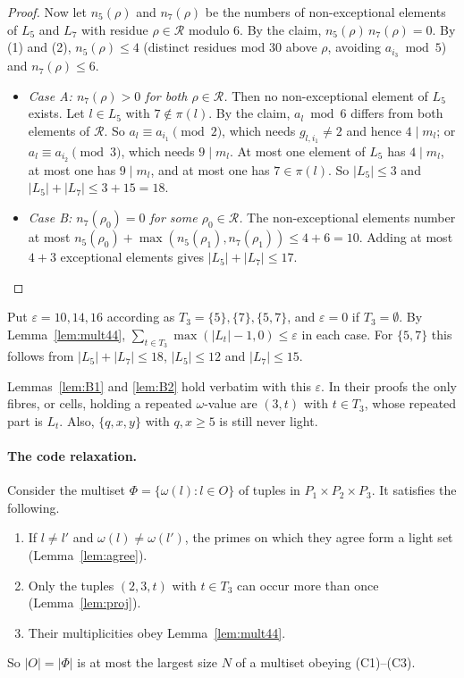 \documentclass[11pt]{article}
\theoremstyle{definition}
\theoremstyle{remark}
\begin{document}
\begin{proof}
Now let $n_5(\rho)$ and $n_7(\rho)$ be the numbers of non-exceptional elements of $L_5$ and $L_7$
with residue $\rho\in\mathcal R$ modulo $6$. By the claim, $n_5(\rho)\,n_7(\rho)=0$. By (1) and
(2), $n_5(\rho)\le4$ (distinct residues mod $30$ above $\rho$, avoiding $a_{i_3}\bmod5$) and
$n_7(\rho)\le6$.
\begin{itemize}
\item \emph{Case A: $n_7(\rho)>0$ for both $\rho\in\mathcal R$.} Then no non-exceptional element
  of $L_5$ exists. Let $l\in L_5$ with $7\notin\pi(l)$. By the claim, $a_l\bmod6$ differs from
  both elements of $\mathcal R$. So $a_l\equiv a_{i_1}\pmod2$, which needs $g_{l,i_1}\ne2$ and
  hence $4\mid m_l$; or $a_l\equiv a_{i_2}\pmod3$, which needs $9\mid m_l$. At most one element
  of $L_5$ has $4\mid m_l$, at most one has $9\mid m_l$, and at most one has $7\in\pi(l)$. So
  $|L_5|\le3$ and $|L_5|+|L_7|\le3+15=18$.
\item \emph{Case B: $n_7(\rho_0)=0$ for some $\rho_0\in\mathcal R$.} The non-exceptional elements
  number at most $n_5(\rho_0)+\max(n_5(\rho_1),n_7(\rho_1))\le4+6=10$. Adding at most $4+3$
  exceptional elements gives $|L_5|+|L_7|\le17$.\qedhere
\end{itemize}
\end{proof}

Put $\varepsilon=10,14,16$ according as $T_3=\{5\},\{7\},\{5,7\}$, and $\varepsilon=0$ if
$T_3=\emptyset$. By Lemma~\ref{lem:mult44}, $\sum_{t\in T_3}\max(|L_t|-1,0)\le\varepsilon$ in each
case. For $\{5,7\}$ this follows from $|L_5|+|L_7|\le18$, $|L_5|\le12$ and $|L_7|\le15$.

Lemmas~\ref{lem:B1} and \ref{lem:B2} hold verbatim with this $\varepsilon$. In their proofs the
only fibres, or cells, holding a repeated $\omega$-value are $(3,t)$ with $t\in T_3$, whose
repeated part is $L_t$. Also, $\{q,x,y\}$ with $q,x\ge5$ is still never light.

\paragraph{The code relaxation.} Consider the multiset $\Phi=\{\omega(l):l\in O\}$ of tuples in
$P_1\times P_2\times P_3$. It satisfies the following.
\begin{enumerate}
\item[(C1)] If $l\ne l'$ and $\omega(l)\ne\omega(l')$, the primes on which they agree form a light set
  (Lemma~\ref{lem:agree}).
\item[(C2)] Only the tuples $(2,3,t)$ with $t\in T_3$ can occur more than once
  (Lemma~\ref{lem:proj}).
\item[(C3)] Their multiplicities obey Lemma~\ref{lem:mult44}.
\end{enumerate}
So $|O|=|\Phi|$ is at most the largest size $N$ of a multiset obeying (C1)--(C3).
\end{document}
